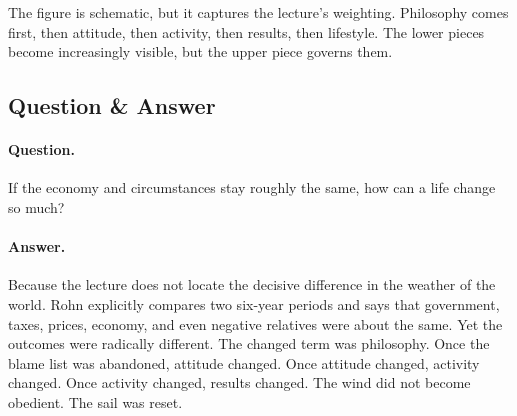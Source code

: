 \begin{figure}
\centering
{}
\end{figure}

The figure is schematic, but it captures the lecture's weighting. Philosophy comes first, then attitude, then activity, then results, then lifestyle. The lower pieces become increasingly visible, but the upper piece governs them.

\subsection{Question \& Answer}

\paragraph{Question.}
If the economy and circumstances stay roughly the same, how can a life change so much?

\paragraph{Answer.}
Because the lecture does not locate the decisive difference in the weather of the world. Rohn explicitly compares two six-year periods and says that government, taxes, prices, economy, and even negative relatives were about the same. Yet the outcomes were radically different. The changed term was philosophy. Once the blame list was abandoned, attitude changed. Once attitude changed, activity changed. Once activity changed, results changed. The wind did not become obedient. The sail was reset.

